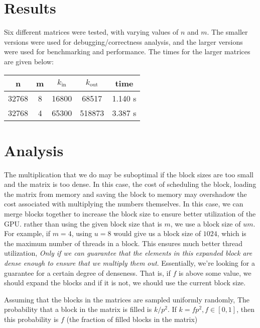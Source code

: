 \documentclass[12pt]{article}
\begin{document}
\section{Results}

Six different matrices were tested, with varying values of $n$ and $m$. The smaller
versions were used for debugging/correctness analysis, and the larger versions 
were used for benchmarking and performance. The times for the larger matrices
are given below:

\begin{center}
\begin{tabular}{|c|c|c|c|c|}
    \hline 
    n & m & $k_\text{in}$ & $k_\text{out}$ & time \\
    \hline 
    32768 & 8 & 16800 & 68517 & 1.140 s \\
    32768 & 4 & 65300 & 518873 & 3.387 s \\
    \hline 
\end{tabular}
\end{center}

\section{Analysis}

The multiplication that we do may be suboptimal if the block sizes are too small 
and the matrix is too dense. In this case, the cost of scheduling the block, 
loading the matrix from memory and saving the block to memory may overshadow 
the cost associated with multiplying the numbers themselves. In this case, we can
merge blocks together to increase the block size to ensure better utilization 
of the GPU. rather than using the given block size that is $m$,
we use a block size of $um$. For example, if $m = 4$, using $u=8$ would give us 
a block size of $1024$, which is the maximum number of threads in a block. This 
ensures much better thread utilization, \emph{Only if we can guarantee that the 
elements in this expanded block are dense enough to ensure that we multiply them 
out}. Essentially, we're looking for a guarantee for a certain degree of 
denseness. That is, if $f$ is above some value, we should expand the blocks and 
if it is not, we should use the current block size.

Assuming that the blocks in the matrices are sampled uniformly randomly, The 
probability that a block in the matrix is filled is $k/p^2$. If $k = f p^2, f \in [0,1]$,
then this probability is $f$ (the fraction of filled blocks in the matrix)
\end{document}
